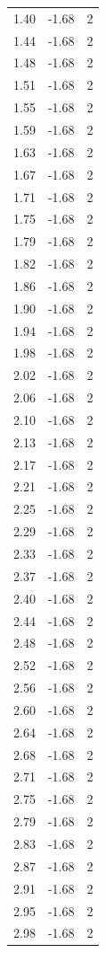 \begin{longtable}{lrr}
  1.40 & -1.68 & 2 \\
  1.44 & -1.68 & 2 \\
  1.48 & -1.68 & 2 \\
  1.51 & -1.68 & 2 \\
  1.55 & -1.68 & 2 \\
  1.59 & -1.68 & 2 \\
  1.63 & -1.68 & 2 \\
  1.67 & -1.68 & 2 \\
  1.71 & -1.68 & 2 \\
  1.75 & -1.68 & 2 \\
  1.79 & -1.68 & 2 \\
  1.82 & -1.68 & 2 \\
  1.86 & -1.68 & 2 \\
  1.90 & -1.68 & 2 \\
  1.94 & -1.68 & 2 \\
  1.98 & -1.68 & 2 \\
  2.02 & -1.68 & 2 \\
  2.06 & -1.68 & 2 \\
  2.10 & -1.68 & 2 \\
  2.13 & -1.68 & 2 \\
  2.17 & -1.68 & 2 \\
  2.21 & -1.68 & 2 \\
  2.25 & -1.68 & 2 \\
  2.29 & -1.68 & 2 \\
  2.33 & -1.68 & 2 \\
  2.37 & -1.68 & 2 \\
  2.40 & -1.68 & 2 \\
  2.44 & -1.68 & 2 \\
  2.48 & -1.68 & 2 \\
  2.52 & -1.68 & 2 \\
  2.56 & -1.68 & 2 \\
  2.60 & -1.68 & 2 \\
  2.64 & -1.68 & 2 \\
  2.68 & -1.68 & 2 \\
  2.71 & -1.68 & 2 \\
  2.75 & -1.68 & 2 \\
  2.79 & -1.68 & 2 \\
  2.83 & -1.68 & 2 \\
  2.87 & -1.68 & 2 \\
  2.91 & -1.68 & 2 \\
  2.95 & -1.68 & 2 \\
  2.98 & -1.68 & 2 \\

\end{longtable}
